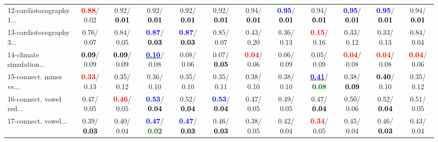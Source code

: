 \begin{table}[h]
\begin{center}
{\begin{tabular}{lc|c|c|c|c|c|c|c|c|c|c}
12-cardiotocography 1... & \textcolor{red}{\textbf{  0.88}}/  0.02 &   0.92/\textcolor{black}{\textbf{  0.01}} &   0.92/\textcolor{black}{\textbf{  0.01}} &   0.92/\textcolor{black}{\textbf{  0.01}} &   0.92/\textcolor{black}{\textbf{  0.01}} &   0.94/\textcolor{black}{\textbf{  0.01}} & \textcolor{blue}{\textbf{  0.95}}/\textcolor{black}{\textbf{  0.01}} &   0.94/\textcolor{black}{\textbf{  0.01}} & \textcolor{blue}{\textbf{  0.95}}/\textcolor{black}{\textbf{  0.01}} & \textcolor{blue}{\textbf{  0.95}}/\textcolor{black}{\textbf{  0.01}} &   0.94/\textcolor{black}{\textbf{  0.01}} \\
13-cardiotocography 3... &   0.76/  0.07 &   0.84/  0.05 & \textcolor{blue}{\textbf{  0.87}}/\textcolor{black}{\textbf{  0.03}} & \textcolor{blue}{\textbf{  0.87}}/\textcolor{black}{\textbf{  0.03}} &   0.85/  0.07 &   0.43/  0.20 &   0.36/  0.13 & \textcolor{red}{\textbf{  0.15}}/  0.16 &   0.33/  0.12 &   0.33/  0.13 &   0.84/  0.04 \\
14-climate simulation... & \textcolor{black}{\textbf{  0.09}}/  0.09 & \textcolor{black}{\textbf{  0.09}}/  0.09 & \underline{\textcolor{blue}{\textbf{  0.10}}}/  0.08 &   0.08/  0.06 &   0.07/\textcolor{black}{\textbf{  0.05}} & \textcolor{red}{\textbf{  0.04}}/  0.06 &   0.06/  0.09 &   0.05/  0.09 & \textcolor{red}{\textbf{  0.04}}/  0.08 & \textcolor{red}{\textbf{  0.04}}/  0.08 & \textcolor{red}{\textbf{  0.04}}/  0.06 \\ \hline
15-connect. mines vs... & \textcolor{red}{\textbf{  0.33}}/  0.13 &   0.35/  0.12 &   0.36/  0.10 &   0.35/  0.10 &   0.35/  0.11 &   0.38/  0.10 &   0.38/  0.10 & \underline{\textcolor{blue}{\textbf{  0.41}}}/\textcolor{darkgreen}{\textbf{  0.08}} &   0.38/\textcolor{black}{\textbf{  0.09}} & \textcolor{black}{\textbf{  0.40}}/  0.10 &   0.35/  0.12 \\
16-connect. vowel red... &   0.47/  0.05 & \textcolor{red}{\textbf{  0.46}}/  0.05 & \textcolor{blue}{\textbf{  0.53}}/\textcolor{black}{\textbf{  0.04}} &   0.52/\textcolor{black}{\textbf{  0.04}} & \textcolor{blue}{\textbf{  0.53}}/\textcolor{black}{\textbf{  0.04}} &   0.47/  0.05 &   0.49/  0.05 &   0.47/\textcolor{black}{\textbf{  0.04}} &   0.50/  0.06 &   0.52/\textcolor{black}{\textbf{  0.04}} &   0.51/  0.05 \\
17-connect. vowel... &   0.39/\textcolor{black}{\textbf{  0.03}} &   0.40/  0.04 & \textcolor{blue}{\textbf{  0.47}}/\textcolor{darkgreen}{\textbf{  0.02}} & \textcolor{blue}{\textbf{  0.47}}/\textcolor{black}{\textbf{  0.03}} &   0.46/\textcolor{black}{\textbf{  0.03}} &   0.38/  0.05 &   0.42/  0.04 & \textcolor{red}{\textbf{  0.34}}/  0.05 &   0.45/  0.04 &   0.46/\textcolor{black}{\textbf{  0.03}} &   0.43/  0.04 \\

\end{tabular}}
\end{center}
\end{table}

